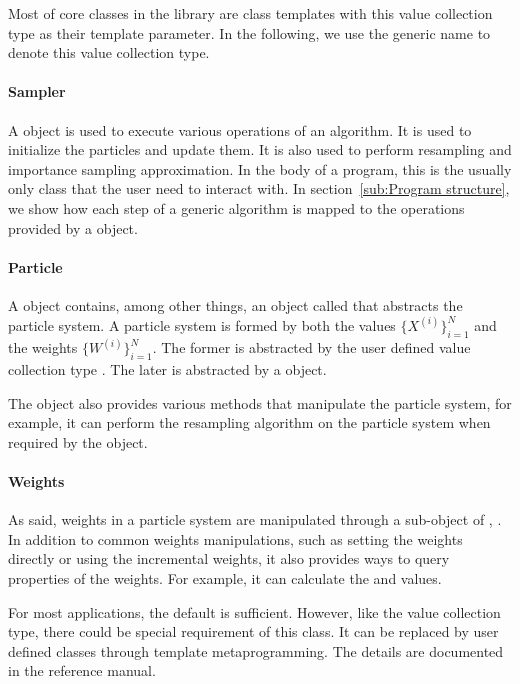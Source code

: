 Most of core classes in the library are class templates with this value
collection type as their template parameter. In the following, we use the
generic name  to denote this value collection type.

\paragraph{Sampler}

A  object is used to execute various operations of an
\smc algorithm. It is used to initialize the particles and update them. It is
also used to perform resampling and importance sampling approximation. In the
body of a program, this is the usually only class that the user need to
interact with. In section~\ref{sub:Program structure}, we show how each step
of a generic \smc algorithm is mapped to the operations provided by a
 object.

\paragraph{Particle}

A  object contains, among other things, an object called
 that abstracts the particle system. A particle system
is formed by both the values $\{X^{(i)}\}_{i=1}^N$ and the weights
$\{W^{(i)}\}_{i=1}^N$. The former is abstracted by the user defined value
collection type . The later is abstracted by a
 object.

The  object also provides various methods that
manipulate the particle system, for example, it can perform the resampling
algorithm on the particle system when required by the 
object.

\paragraph{Weights}

As said, weights in a particle system are manipulated through a sub-object of
, . In addition to common
weights manipulations, such as setting the weights directly or using the
incremental weights, it also provides ways to query properties of the
weights. For example, it can calculate the \ess and \cess values.

For most applications, the default  is sufficient.
However, like the value collection type, there could be special requirement of
this class. It can be replaced by user defined classes through \cpp template
metaprogramming. The details are documented in the reference manual.

